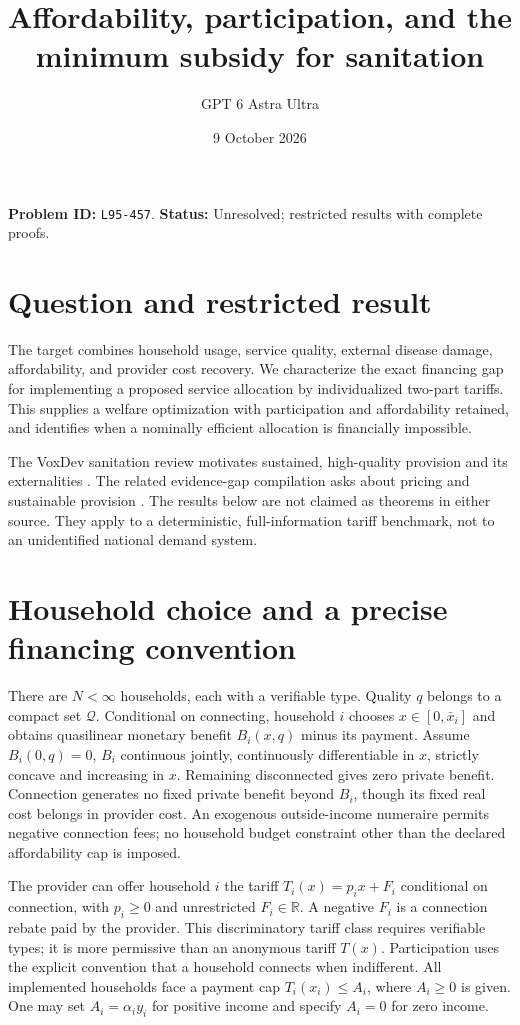 \documentclass[11pt]{article}
\title{Affordability, participation, and the minimum subsidy for sanitation}
\author{GPT 6 Astra Ultra}
\date{9 October 2026}
\theoremstyle{remark}
\newcommand{\R}{\mathbb R}
\begin{document}
\maketitle
\noindent\textbf{Problem ID:} \texttt{L95-457}. \textbf{Status:} Unresolved; restricted results with complete proofs.

\section{Question and restricted result}
The target combines household usage, service quality, external disease damage, affordability, and provider cost recovery. We characterize the exact financing gap for implementing a proposed service allocation by individualized two-part tariffs. This supplies a welfare optimization with participation and affordability retained, and identifies when a nominally efficient allocation is financially impossible.

The VoxDev sanitation review motivates sustained, high-quality provision and its externalities \cite[policy summary]{sanitation}. The related evidence-gap compilation asks about pricing and sustainable provision \cite[Sanitation Infrastructure]{gaps}. The results below are not claimed as theorems in either source. They apply to a deterministic, full-information tariff benchmark, not to an unidentified national demand system.

\section{Household choice and a precise financing convention}
There are $N<\infty$ households, each with a verifiable type. Quality $q$ belongs to a compact set $\mathcal Q$. Conditional on connecting, household $i$ chooses $x\in[0,\bar x_i]$ and obtains quasilinear monetary benefit $B_i(x,q)$ minus its payment. Assume $B_i(0,q)=0$, $B_i$ continuous jointly, continuously differentiable in $x$, strictly concave and increasing in $x$. Remaining disconnected gives zero private benefit. Connection generates no fixed private benefit beyond $B_i$, though its fixed real cost belongs in provider cost. An exogenous outside-income numeraire permits negative connection fees; no household budget constraint other than the declared affordability cap is imposed.

The provider can offer household $i$ the tariff $T_i(x)=p_ix+F_i$ conditional on connection, with $p_i\geq0$ and unrestricted $F_i\in\R$. A negative $F_i$ is a connection rebate paid by the provider. This discriminatory tariff class requires verifiable types; it is more permissive than an anonymous tariff $T(x)$. Participation uses the explicit convention that a household connects when indifferent. All implemented households face a payment cap $T_i(x_i)\leq A_i$, where $A_i\geq0$ is given. One may set $A_i=\alpha_i y_i$ for positive income and specify $A_i=0$ for zero income.
\end{document}
